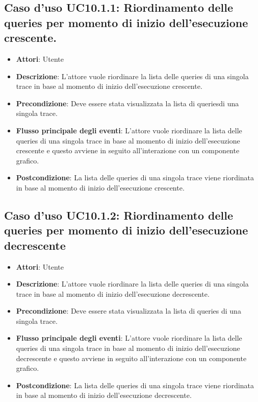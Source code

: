 \subsection{Caso d'uso UC10.1.1: Riordinamento delle queries per momento di inizio dell'esecuzione crescente.}
\begin{itemize}
\item \textbf{Attori}: Utente
\item \textbf{Descrizione}: L'attore vuole riordinare la lista delle queries di una singola trace in base al momento di inizio dell'esecuzione crescente.
\item \textbf{Precondizione}: Deve essere stata visualizzata la lista di queriesdi una singola trace.
\item \textbf{Flusso principale degli eventi}: L'attore vuole riordinare la lista delle queries di una singola trace in base al momento di inizio dell'esecuzione crescente e questo avviene in seguito all'interazione con un componente grafico.
\item \textbf{Postcondizione}: La lista delle queries di una singola trace viene riordinata in base al momento di inizio dell'esecuzione crescente.
\end{itemize}
\subsection{Caso d'uso UC10.1.2: Riordinamento delle queries per momento di inizio dell'esecuzione decrescente}
\begin{itemize}
\item \textbf{Attori}: Utente
\item \textbf{Descrizione}: L'attore vuole riordinare la lista delle queries di una singola trace in base al momento di inizio dell'esecuzione decrescente.
\item \textbf{Precondizione}: Deve essere stata visualizzata la lista di queries di una singola trace.
\item \textbf{Flusso principale degli eventi}: L'attore vuole riordinare la lista delle queries di una singola trace in base al momento di inizio dell'esecuzione decrescente e questo avviene in seguito all'interazione con un componente grafico.
\item \textbf{Postcondizione}: La lista delle queries di una singola trace viene riordinata in base al momento di inizio dell'esecuzione decrescente.
\end{itemize}
